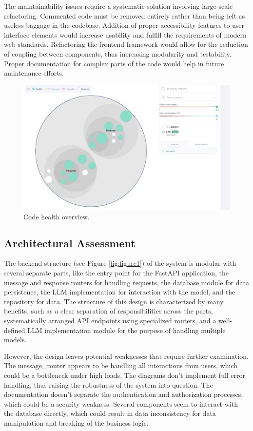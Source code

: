 \documentclass[sigconf]{acmart}
\begin{document}
The maintainability issues require a systematic solution involving large-scale refactoring. Commented code must be removed entirely rather than being left as useless baggage in the codebase. Addition of proper accessibility features to user interface elements would increase usability and fulfill the requirements of modern web standards. Refactoring the frontend framework would allow for the reduction of coupling between components, thus increasing modularity and testability. Proper documentation for complex parts of the code would help in future maintenance efforts.

\begin{figure}[htbp]
    \centering
    \includegraphics[width=1\linewidth]{Image6.jpg}
    \caption{Code health overview.}
    \label{fig:figure8}
\end{figure}

\subsection{Architectural Assessment}
The backend structure (see Figure \ref{fig:figure1}) of the system is modular with several separate parts, like the entry point for the FastAPI application, the message and response routers for handling requests, the database module for data persistence, the LLM implementation for interaction with the model, and the repository for data. The structure of this design is characterized by many benefits, such as a clear separation of responsibilities across the parts, systematically arranged API endpoints using specialized routers, and a well-defined LLM implementation module for the purpose of handling multiple models.

However, the design leaves potential weaknesses that require further examination. The message\_router appears to be handling all interactions from users, which could be a bottleneck under high loads. The diagrams don't implement full error handling, thus raising the robustness of the system into question. The documentation doesn't separate the authentication and authorization processes, which could be a security weakness. Several components seem to interact with the database directly, which could result in data inconsistency for data manipulation and breaking of the business logic.
\end{document}
